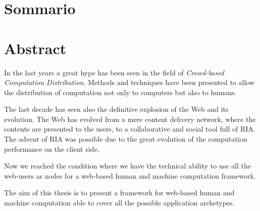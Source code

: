 
\cleardoublepage
{}
{}
\begingroup
\let\clearpage\relax
\let\cleardoublepage\relax
\let\cleardoublepage\relax

\chapter*{Sommario}



\vfill

\chapter*{Abstract}

In the last years a great hype has been seen in the field of \emph{Crowd-based
Computation Distribution}. Methods and techniques have been presented to allow the
distribution of computation not only to computers but also to humans.

The last decade has seen also the definitive explosion of the Web and its evolution.
The Web has evolved from a mere content delivery network, where the contents are
presented to the users, to a collaborative and social tool full of \ac{RIA}. The
advent of \ac{RIA} was possible due to the great evolution of the computation
performance on the client side.

Now we reached the condition where we have the technical ability to use all the
web-users as nodes for a web-based human and machine computation framework.

The aim of this thesis is to present a framework for web-based human and machine
computation able to cover all the possible application archetypes.



\endgroup			

\vfill

